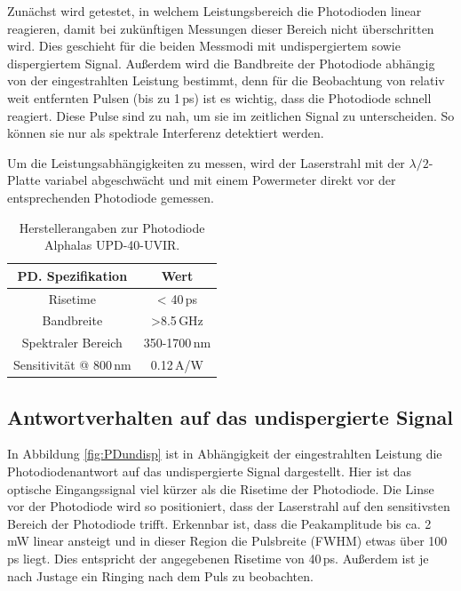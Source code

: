 \documentclass[bachelor,       %
               twoside,        %
               BCOR10mm,       %
               liststotoc,nomtotoc,bibtotoc, %
               english,ngerman, %
               final,          %
               ]{GAUBM}
\begin{document}
Zunächst wird getestet, in welchem Leistungsbereich die Photodioden linear reagieren, damit bei zukünftigen Messungen dieser Bereich nicht überschritten wird.
Dies geschieht für die beiden Messmodi mit undispergiertem sowie dispergiertem Signal.
Außerdem wird die Bandbreite der Photodiode abhängig von der eingestrahlten Leistung bestimmt, denn für die Beobachtung von relativ weit entfernten Pulsen (bis zu 1\,ps) ist es wichtig, dass die Photodiode schnell reagiert.
Diese Pulse sind zu nah, um sie im zeitlichen Signal zu unterscheiden.
So können sie nur als spektrale Interferenz detektiert werden.

Um die Leistungsabhängigkeiten zu messen, wird der Laserstrahl mit der $\lambda/2$-Platte variabel abgeschwächt und mit einem Powermeter direkt vor der entsprechenden Photodiode gemessen.

\begin{table}[!htb]
	\centering
	\begin{tabular}{|c|c|}
		\hline
		PD. Spezifikation & Wert \\		
		\hline
		Risetime & < 40\,ps \\
		Bandbreite & >8.5\,GHz \\
		Spektraler Bereich & 350-1700\,nm \\
		Sensitivität @ 800\,nm & 0.12\,A/W\\
		\hline	
	\end{tabular}
	\caption{Herstellerangaben zur Photodiode Alphalas UPD-40-UVIR.}
	\label{tab:PD}
\end{table}

\subsection{Antwortverhalten auf das undispergierte Signal}
In Abbildung \ref{fig:PDundisp} ist in Abhängigkeit der eingestrahlten Leistung die Photodiodenantwort auf das undispergierte Signal dargestellt.
Hier ist  das optische Eingangssignal viel kürzer als die Risetime der Photodiode.
Die Linse vor der Photodiode wird so positioniert, dass der Laserstrahl auf den sensitivsten Bereich der Photodiode trifft.
Erkennbar ist, dass die Peakamplitude bis ca. 2\,mW linear ansteigt und in dieser Region die Pulsbreite (FWHM) etwas über 100\,ps liegt.
Dies entspricht der angegebenen Risetime von 40\,ps.
Außerdem ist je nach Justage ein Ringing nach dem Puls zu beobachten.
\end{document}
